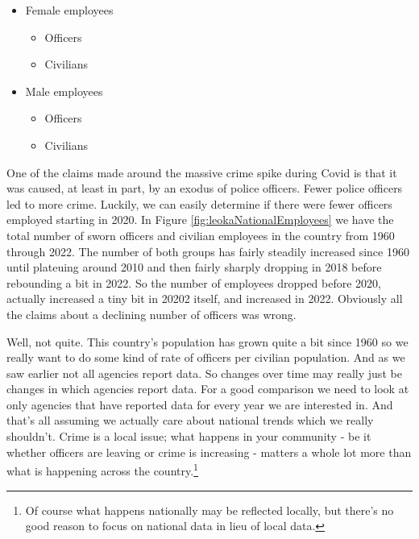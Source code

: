 \documentclass[
]{krantz}
\providecommand{\tightlist}{%
  \setlength{\itemsep}{0pt}\setlength{\parskip}{0pt}}
\begin{document}
\begin{itemize}
\tightlist
\item
  Female employees

  \begin{itemize}
  \tightlist
  \item
    Officers
  \item
    Civilians
  \end{itemize}
\item
  Male employees

  \begin{itemize}
  \tightlist
  \item
    Officers
  \item
    Civilians
  \end{itemize}
\end{itemize}

One of the claims made around the massive crime spike during
Covid is that it was caused, at least in part, by an exodus
of police officers. Fewer police officers led to more crime.
Luckily, we can easily determine if there were fewer
officers employed starting in 2020. In Figure
\ref{fig:leokaNationalEmployees} we have the total number of
sworn officers and civilian employees in the country from
1960 through 2022. The number of both groups has fairly
steadily increased since 1960 until plateuing around 2010
and then fairly sharply dropping in 2018 before rebounding a
bit in 2022. So the number of employees dropped before 2020,
actually increased a tiny bit in 20202 itself, and increased
in 2022. Obviously all the claims about a declining number
of officers was wrong.

Well, not quite. This country's population has grown quite a
bit since 1960 so we really want to do some kind of rate of
officers per civilian population. And as we saw earlier not
all agencies report data. So changes over time may really
just be changes in which agencies report data. For a good
comparison we need to look at only agencies that have
reported data for every year we are interested in. And
that's all assuming we actually care about national trends
which we really shouldn't. Crime is a local issue; what
happens in your community - be it whether officers are
leaving or crime is increasing - matters a whole lot more
than what is happening across the country.\footnote{Of
  course what happens nationally may be reflected locally,
  but there's no good reason to focus on national data in
  lieu of local data.}
\end{document}
